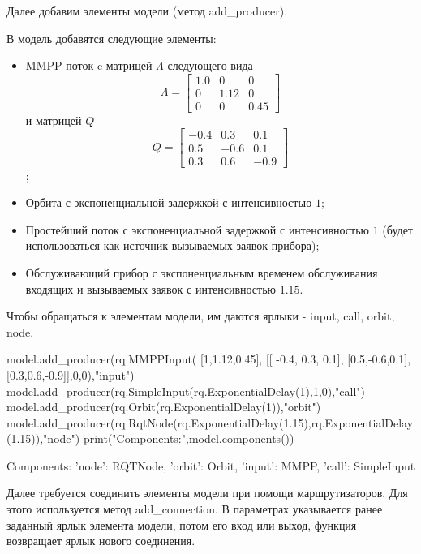 Далее добавим элементы модели (метод add\_producer). 

В модель добавятся следующие элементы: 
\begin{itemize}
	\item MMPP поток c матрицей $\Lambda$ следующего вида
		\begin{equation*}
			\Lambda =  \begin{bmatrix}
			1.0 & 0 &  0\\
			0 & 1.12 & 0\\
			0 & 0 &	0.45
			\end{bmatrix}
		\end{equation*} и матрицей $Q$
		\begin{equation*}
			Q =  \begin{bmatrix}
				-0.4 & 0.3 &  0.1\\
				0.5 & -0.6 & 0.1\\
				0.3 & 0.6 &	-0.9
			\end{bmatrix}
		\end{equation*};
	\item Орбита с экспоненциальной задержкой с интенсивностью $1$;
	\item Простейший поток с экспоненциальной задержкой с интенсивностью $1$ (будет использоваться как источник вызываемых заявок прибора);
	\item Обслуживающий прибор с экспоненциальным временем обслуживания входящих и вызываемых заявок с интенсивностью $1.15$.
\end{itemize}
Чтобы обращаться к элементам модели, им даются ярлыки - input, call, orbit, node.


\begin{pyin}
model.add_producer(rq.MMPPInput(
[1,1.12,0.45],
[[ -0.4, 0.3, 0.1],
[0.5,-0.6,0.1],
[0.3,0.6,-0.9]],0,0),"input")
model.add_producer(rq.SimpleInput(rq.ExponentialDelay(1),1,0),"call")
model.add_producer(rq.Orbit(rq.ExponentialDelay(1)),"orbit")
model.add_producer(rq.RqtNode(rq.ExponentialDelay(1.15),rq.ExponentialDelay(1.15)),"node")
print("Components:",model.components())
\end{pyin}

\begin{pyout}
	Components: {'node': RQTNode, 'orbit': Orbit, 'input': MMPP, 'call': SimpleInput}
\end{pyout}

Далее требуется соединить элементы модели при помощи маршрутизаторов. Для этого используется метод add\_connection. В параметрах указывается ранее заданный ярлык элемента модели, потом его вход или выход, функция возвращает ярлык нового соединения.

